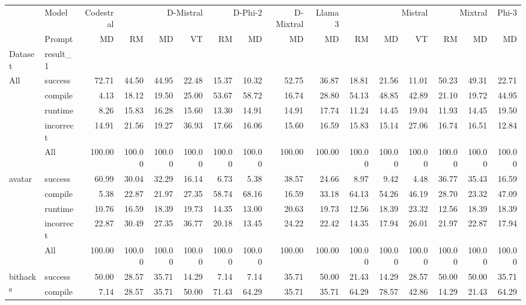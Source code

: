 \begin{tabular}{llrrrrrrrrrrrrrr}
\toprule
 & Model & Codestral & \multicolumn{3}{r}{D-Mistral} & \multicolumn{2}{r}{D-Phi-2} & D-Mixtral & Llama 3 & \multicolumn{3}{r}{Mistral} & \multicolumn{2}{r}{Mixtral} & Phi-3 \\
 & Prompt & MD & RM & MD & VT & RM & MD & MD & MD & RM & MD & VT & RM & MD & MD \\
Dataset & result_1 &  &  &  &  &  &  &  &  &  &  &  &  &  &  \\
\midrule
\multirow[t]{5}{*}{All} & success & 72.71 & 44.50 & 44.95 & 22.48 & 15.37 & 10.32 & 52.75 & 36.87 & 18.81 & 21.56 & 11.01 & 50.23 & 49.31 & 22.71 \\
 & compile & 4.13 & 18.12 & 19.50 & 25.00 & 53.67 & 58.72 & 16.74 & 28.80 & 54.13 & 48.85 & 42.89 & 21.10 & 19.72 & 44.95 \\
 & runtime & 8.26 & 15.83 & 16.28 & 15.60 & 13.30 & 14.91 & 14.91 & 17.74 & 11.24 & 14.45 & 19.04 & 11.93 & 14.45 & 19.50 \\
 & incorrect & 14.91 & 21.56 & 19.27 & 36.93 & 17.66 & 16.06 & 15.60 & 16.59 & 15.83 & 15.14 & 27.06 & 16.74 & 16.51 & 12.84 \\
 & All & 100.00 & 100.00 & 100.00 & 100.00 & 100.00 & 100.00 & 100.00 & 100.00 & 100.00 & 100.00 & 100.00 & 100.00 & 100.00 & 100.00 \\
\cline{1-16}
\multirow[t]{5}{*}{avatar} & success & 60.99 & 30.04 & 32.29 & 16.14 & 6.73 & 5.38 & 38.57 & 24.66 & 8.97 & 9.42 & 4.48 & 36.77 & 35.43 & 16.59 \\
 & compile & 5.38 & 22.87 & 21.97 & 27.35 & 58.74 & 68.16 & 16.59 & 33.18 & 64.13 & 54.26 & 46.19 & 28.70 & 23.32 & 47.09 \\
 & runtime & 10.76 & 16.59 & 18.39 & 19.73 & 14.35 & 13.00 & 20.63 & 19.73 & 12.56 & 18.39 & 23.32 & 12.56 & 18.39 & 18.39 \\
 & incorrect & 22.87 & 30.49 & 27.35 & 36.77 & 20.18 & 13.45 & 24.22 & 22.42 & 14.35 & 17.94 & 26.01 & 21.97 & 22.87 & 17.94 \\
 & All & 100.00 & 100.00 & 100.00 & 100.00 & 100.00 & 100.00 & 100.00 & 100.00 & 100.00 & 100.00 & 100.00 & 100.00 & 100.00 & 100.00 \\
\cline{1-16}
\multirow[t]{5}{*}{bithacks} & success & 50.00 & 28.57 & 35.71 & 14.29 & 7.14 & 7.14 & 35.71 & 50.00 & 21.43 & 14.29 & 28.57 & 50.00 & 50.00 & 35.71 \\
 & compile & 7.14 & 28.57 & 35.71 & 50.00 & 71.43 & 64.29 & 35.71 & 35.71 & 64.29 & 78.57 & 42.86 & 14.29 & 21.43 & 64.29 \\

\end{tabular}
